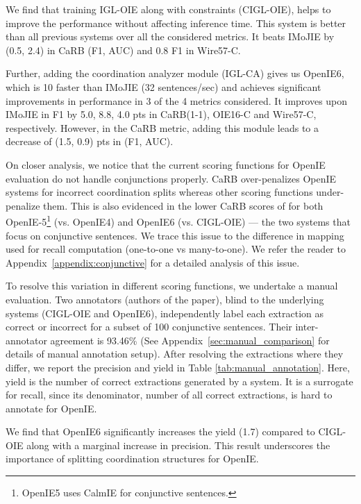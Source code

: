 \documentclass[11pt,a4paper]{article}
\newcommand{\shortname}{{\scshape IGL}}
\begin{document}
We find that training \shortname-OIE along with constraints (C\shortname-OIE), helps to improve the performance without affecting inference time. 
This system is better than all previous systems over all the considered metrics. It beats IMoJIE by (0.5, 2.4) in CaRB (F1, AUC) and 0.8 F1 in Wire57-C. 


Further, adding the coordination analyzer module (\shortname-CA) gives us OpenIE6, which is 10 faster than IMoJIE (32 sentences/sec) and achieves significant improvements in performance in 3 of the 4 metrics considered. It improves upon IMoJIE in F1 by 5.0, 8.8, 4.0 pts in CaRB(1-1), OIE16-C and Wire57-C, respectively. However, in the CaRB metric, adding this module leads to a decrease of (1.5, 0.9) pts in (F1, AUC).


On closer analysis, we notice that the current scoring functions for OpenIE evaluation do not handle conjunctions properly. CaRB over-penalizes OpenIE systems for incorrect coordination splits whereas other scoring functions under-penalize them. This is also evidenced in the lower CaRB scores of for both OpenIE-5\footnote{OpenIE5 uses CalmIE for conjunctive sentences.} (vs. OpenIE4) and
OpenIE6
(vs. C\shortname-OIE) --- the two systems that focus on conjunctive sentences. We trace this issue to the difference in mapping used for recall computation (one-to-one vs many-to-one). We refer the reader to Appendix~\ref{appendix:conjunctive} for a detailed analysis of this issue.


To resolve this variation in different scoring functions, we undertake a manual evaluation. Two annotators (authors of the paper), blind to the underlying systems (C\shortname-OIE and
OpenIE6),
independently label each extraction as correct or incorrect for a subset of 100 conjunctive sentences. Their inter-annotator agreement is 93.46\% (See Appendix~\ref{sec:manual_comparison} for details of manual annotation setup). After resolving the extractions where they differ, we report the precision and yield in Table \ref{tab:manual_annotation}. Here, yield is the number of correct extractions generated by a system. It is a surrogate for recall, since its denominator, number of all correct extractions, is hard to annotate for OpenIE.  

We find that
OpenIE6
significantly increases the yield (1.7) compared to C\shortname-OIE along with a marginal increase in precision. This result underscores the importance of splitting coordination structures for 
OpenIE. 
\end{document}
